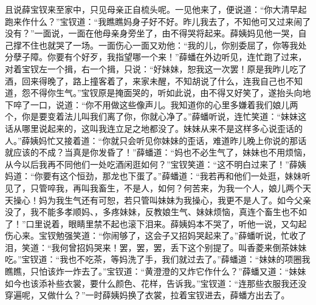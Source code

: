 \documentclass[12pt,oneside]{book}
\begin{document}
且说薛宝钗来至家中，只见母亲正自梳头呢。一见他来了，便说道：“你大清早起跑来作什么？”宝钗道：“我瞧瞧妈身子好不好。昨儿我去了，不知他可又过来闹了没有？”一面说，一面在他母亲身旁坐了，由不得哭将起来。薛姨妈见他一哭，自己撑不住也就哭了一场。一面伤心一面又劝他：“我的儿，你别委屈了，你等我处分孽子障。你要有个好歹，我指望哪一个来！”薛蟠在外边听见，连忙跑了过来，对着宝钗左一个揖，右一个揖，只说：“好妹妹，恕我这一次罢！原是我昨儿吃了酒，回来得晚了，路上撞客着了，来家未醒，不知胡说了什么，连我自己也不知道，怨不得你生气。”宝钗原是掩面哭的，听如此说，由不得又好笑了，遂抬头向地下啐了一口，说道：“你不用做这些像声儿。我知道你的心里多嫌着我们娘儿两个，你是要变着法儿叫我们离了你，你就心净了。”薛蟠听说，连忙笑道：“妹妹这话从哪里说起来的，这叫我连立足之地都没了。妹妹从来不是这样多心说歪话的人。”薛姨妈忙又接着道：“你就只会听见你妹妹的歪话，难道昨儿晚上你说的那话就应该的不成？当真是你发昏了！”薛蟠道：“妈也不必生气了，妹妹也不用烦恼，从今以后我再不同他们一处吃酒闲逛如何？”宝钗笑道：“这不明白过来了！”薛姨妈道：“你要有这个恒劲，那龙也下蛋了。”薛蟠道：“我若再和他们一处逛，妹妹听见了，只管啐我，再叫我畜生，不是人，如何？何苦来，为我一个人，娘儿两个天天操心！妈为我生气还有可恕，若只管叫妹妹为我操心，我更不是人了。如今父亲没了，我不能多孝顺妈、，多疼妹妹，反教娘生气、妹妹烦恼，真连个畜生也不如了！”口里说着，眼睛里禁不起也滚下泪来。薛姨妈本不哭了，听他一说，又勾起伤心来。宝钗勉强笑道：“你闹够了，这会子又招妈哭起来了。”薛蟠听说，忙收了泪，笑道：“我何曾招妈哭来！罢，罢，罢，丢下这个别提了。叫香菱来倒茶妹妹吃。”宝钗道：“我也不吃茶，等妈洗了手，我们就过去了。”薛蟠道：“妹妹的项圈我瞧瞧，只怕该炸一炸去了。”宝钗道：“黄澄澄的又炸它作什么？”薛蟠又道：“妹妹如今也该添补些衣裳，要什么颜色、花样，告诉我。”宝钗道：“连那些衣服我还没穿遍呢，又做什么？”一时薛姨妈换了衣裳，拉着宝钗进去，薛蟠方出去了。
\end{document}
